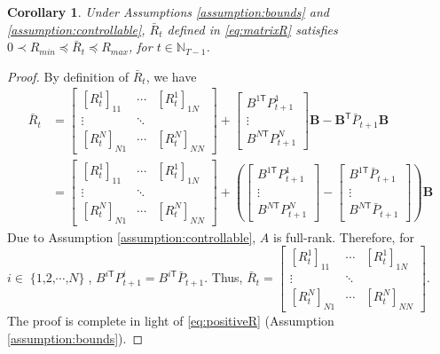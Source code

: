 \documentclass[letterpaper, 10 pt, conference]{ieeeconf}  %
\newcommand{\transpose}{\mathsf{T}}
\DeclareMathOperator{\Nplayers}{\{1,2,\cdots,\textit{N}\}}
\newtheorem{corollary}{Corollary}
\begin{document}
\begin{corollary}\label{corollary:boundedR}
    Under Assumptions \ref{assumption:bounds} and \ref{assumption:controllable}, $\bar{R}_{t}$ defined in \eqref{eq:matrixR} satisfies $0 \prec R_{min} \preceq \bar{R}_{t} \preceq R_{max}$,
    for $t \in \mathbb{N}_{T-1}$.
\end{corollary}
\begin{proof}
    By definition of $\bar{R}_{t}$, we have
    \begin{align*}
        \bar{R}_{t} &= 
        \begin{bmatrix}
            [R_{t}^{1}]_{11} & \cdots & [R_{t}^{1}]_{1N}\\
            \vdots & \ddots\\
            [R_{t}^{N}]_{N1} & \cdots & [R_{t}^{N}]_{NN}
        \end{bmatrix}
        + 
        \begin{bmatrix}
            B^{1\transpose}P_{t+1}^{1}\\
            \vdots\\
            B^{N\transpose}P_{t+1}^{N}
        \end{bmatrix}\mathbf{B}
        - \mathbf{B}^{\transpose}\bar{P}_{t+1}\mathbf{B}\\
        &= \begin{bmatrix}
            [R_{t}^{1}]_{11} & \cdots & [R_{t}^{1}]_{1N}\\
            \vdots & \ddots\\
            [R_{t}^{N}]_{N1} & \cdots & [R_{t}^{N}]_{NN}
        \end{bmatrix}
        + 
        (\begin{bmatrix}
            B^{1\transpose}P_{t+1}^{1}\\
            \vdots\\
            B^{N\transpose}P_{t+1}^{N}
        \end{bmatrix}-
        \begin{bmatrix}
            B^{1\transpose}\bar{P}_{t+1}\\
            \vdots\\
            B^{N\transpose}\bar{P}_{t+1}
        \end{bmatrix}
        )\mathbf{B}
    \end{align*}
    Due to Assumption \ref{assumption:controllable}, $A$ is full-rank. Therefore, for $i \in \Nplayers$,
        $B^{i\transpose}P_{t+1}^{i} = B^{i\transpose}\bar{P}_{t+1}$.
    Thus,
        $\bar{R}_{t} = 
        \begin{bmatrix}
            [R_{t}^{1}]_{11} & \cdots & [R_{t}^{1}]_{1N}\\
            \vdots & \ddots\\
            [R_{t}^{N}]_{N1} & \cdots & [R_{t}^{N}]_{NN}
        \end{bmatrix}$.
    The proof is complete in light of \eqref{eq:positiveR} (Assumption \ref{assumption:bounds}).
\end{proof}
\end{document}
